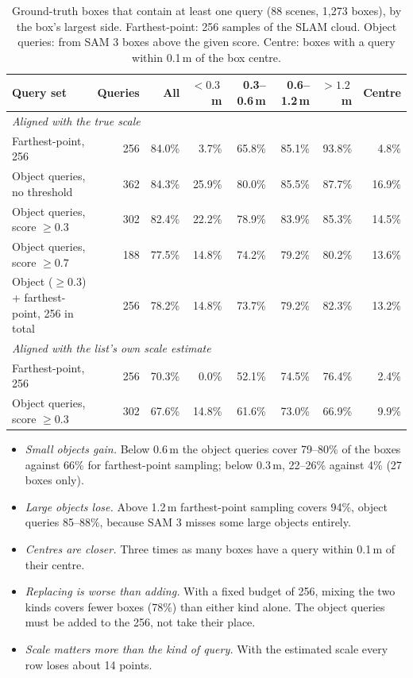 \begin{table}[t]
\centering
\caption{Ground-truth boxes that contain at least one query (88 scenes, 1,273 boxes), by the box's largest side.
Farthest-point: 256 samples of the SLAM cloud. Object queries: from SAM 3 boxes above the given score.
Centre: boxes with a query within 0.1\,m of the box centre.}
\label{tab:arch-cov}
\begin{tabular}{lrrrrrrr}
\toprule
Query set & Queries & All & $<0.3$\,m & 0.3--0.6\,m & 0.6--1.2\,m & $>1.2$\,m & Centre \\
\midrule
\multicolumn{8}{l}{\emph{Aligned with the true scale}} \\
Farthest-point, 256              & 256 & 84.0\% &  3.7\% & 65.8\% & 85.1\% & 93.8\% &  4.8\% \\
Object queries, no threshold     & 362 & 84.3\% & 25.9\% & 80.0\% & 85.5\% & 87.7\% & 16.9\% \\
Object queries, score $\geq 0.3$ & 302 & 82.4\% & 22.2\% & 78.9\% & 83.9\% & 85.3\% & 14.5\% \\
Object queries, score $\geq 0.7$ & 188 & 77.5\% & 14.8\% & 74.2\% & 79.2\% & 80.2\% & 13.6\% \\
Object ($\geq 0.3$) + farthest-point, 256 in total & 256 & 78.2\% & 14.8\% & 73.7\% & 79.2\% & 82.3\% & 13.2\% \\
\midrule
\multicolumn{8}{l}{\emph{Aligned with the list's own scale estimate}} \\
Farthest-point, 256              & 256 & 70.3\% &  0.0\% & 52.1\% & 74.5\% & 76.4\% &  2.4\% \\
Object queries, score $\geq 0.3$ & 302 & 67.6\% & 14.8\% & 61.6\% & 73.0\% & 66.9\% &  9.9\% \\
\bottomrule
\end{tabular}
\end{table}

\begin{itemize}
\item \emph{Small objects gain.} Below 0.6\,m the object queries cover 79--80\% of the boxes against 66\% for
      farthest-point sampling; below 0.3\,m, 22--26\% against 4\% (27 boxes only).
\item \emph{Large objects lose.} Above 1.2\,m farthest-point sampling covers 94\%, object queries 85--88\%,
      because SAM 3 misses some large objects entirely.
\item \emph{Centres are closer.} Three times as many boxes have a query within 0.1\,m of their centre.
\item \emph{Replacing is worse than adding.} With a fixed budget of 256, mixing the two kinds covers fewer boxes
      (78\%) than either kind alone. The object queries must be added to the 256, not take their place.
\item \emph{Scale matters more than the kind of query.} With the estimated scale every row loses about 14
      points.
\end{itemize}

